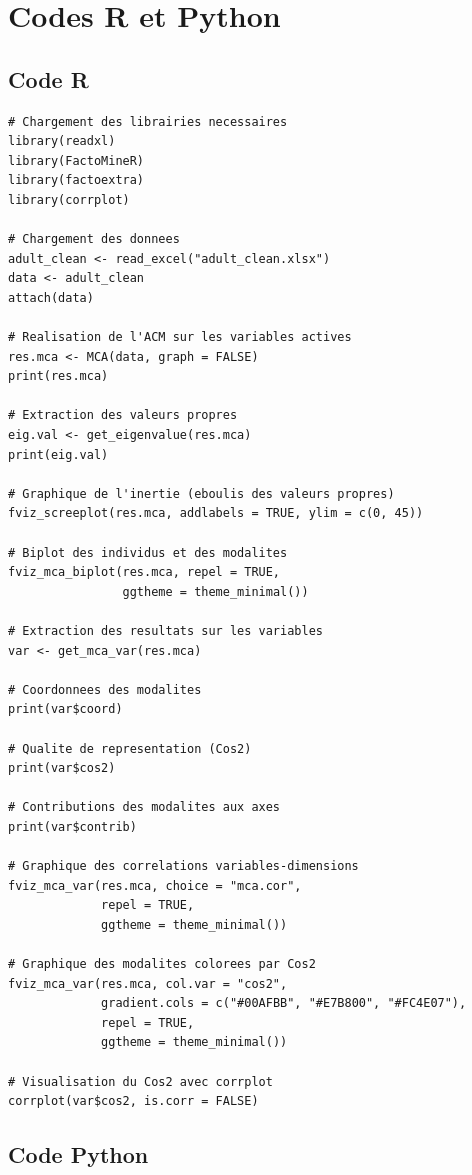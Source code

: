 \documentclass[12pt,a4paper]{article}
\begin{document}
\section{Codes R et Python}

\subsection{Code R}

\begin{lstlisting}[style=Rstyle, caption={Code R pour l'ACM avec FactoMineR et factoextra}]
# Chargement des librairies necessaires
library(readxl)
library(FactoMineR)
library(factoextra)
library(corrplot)

# Chargement des donnees
adult_clean <- read_excel("adult_clean.xlsx")
data <- adult_clean
attach(data)

# Realisation de l'ACM sur les variables actives
res.mca <- MCA(data, graph = FALSE)
print(res.mca)

# Extraction des valeurs propres
eig.val <- get_eigenvalue(res.mca)
print(eig.val)

# Graphique de l'inertie (eboulis des valeurs propres)
fviz_screeplot(res.mca, addlabels = TRUE, ylim = c(0, 45))

# Biplot des individus et des modalites
fviz_mca_biplot(res.mca, repel = TRUE, 
                ggtheme = theme_minimal())

# Extraction des resultats sur les variables
var <- get_mca_var(res.mca)

# Coordonnees des modalites
print(var$coord)

# Qualite de representation (Cos2)
print(var$cos2)

# Contributions des modalites aux axes
print(var$contrib)

# Graphique des correlations variables-dimensions
fviz_mca_var(res.mca, choice = "mca.cor", 
             repel = TRUE, 
             ggtheme = theme_minimal())

# Graphique des modalites colorees par Cos2
fviz_mca_var(res.mca, col.var = "cos2",
             gradient.cols = c("#00AFBB", "#E7B800", "#FC4E07"), 
             repel = TRUE,
             ggtheme = theme_minimal())

# Visualisation du Cos2 avec corrplot
corrplot(var$cos2, is.corr = FALSE)
\end{lstlisting}

\subsection{Code Python}
\end{document}
